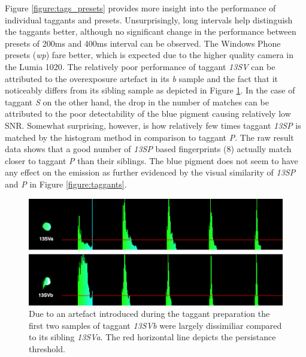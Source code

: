 \documentclass[thesis.tex]{subfiles}
\begin{document}
Figure \ref{figure:tags_presets} provides more insight into the performance of individual taggants and presets. Unsurprisingly, long intervals help distinguish the taggants better, although no significant change in the performance between presets of 200ms and 400ms interval can be observed. The Windows Phone presets (\emph{wp}) fare better, which is expected due to the higher quality camera in the Lumia 1020. The relatively poor performance of taggant \emph{13SV} can be attributed to the overexposure artefact in its \emph{b} sample and the fact that it noticeably differs from its sibling sample as depicted in Figure \ref{figure:13SV}. In the case of taggant \emph{S} on the other hand, the drop in the number of matches can be attributed to the poor detectability of the blue pigment causing relatively low SNR. Somewhat surprising, however, is how relatively few times taggant \emph{13SP} is matched by the histogram method in comparison to taggant \emph{P}. The raw result data shows that a good number of \emph{13SP} based fingerprints (8) actually match closer to taggant \emph{P} than their siblings. The blue pigment does not seem to have any effect on the emission as further evidenced by the visual similarity of \emph{13SP} and \emph{P} in Figure \ref{figure:taggants}.

\begin{figure}[h!]
  \centering \includegraphics[page=1,width=\textwidth]{images/findings/13SV}
  \caption{Due to an artefact introduced during the taggant preparation the first two samples of taggant \emph{13SVb} were largely dissimiliar compared to its sibling \emph{13SVa}. The red horizontal line depicts the persistance threshold.}
  \label{figure:13SV}
\end{figure}
\end{document}
